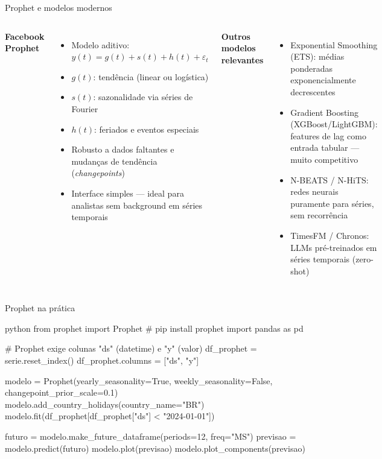 \documentclass[xcolor=dvipsnames,t,aspectratio=169]{beamer}
\newcommand{\highlight}[1]{{\color{nes_dark_orange} #1}}
\begin{document}
\begin{frame}[c]{Prophet e modelos modernos}

\begin{columns}
\textbf{\color{nes_dark_purple}Facebook Prophet}
\begin{itemize}
    \item Modelo aditivo: $y(t) = g(t) + s(t) + h(t) + \varepsilon_t$
    \item $g(t)$: tendência (linear ou logística)
    \item $s(t)$: sazonalidade via séries de Fourier
    \item $h(t)$: feriados e eventos especiais
    \item \highlight{Robusto a dados faltantes} e mudanças de tendência (\emph{changepoints})
    \item Interface simples — ideal para analistas sem background em séries temporais
\end{itemize}

\textbf{\color{nes_dark_purple}Outros modelos relevantes}
\begin{itemize}
    \item \highlight{Exponential Smoothing (ETS)}: médias ponderadas exponencialmente decrescentes
    \item \highlight{Gradient Boosting (XGBoost/LightGBM)}: features de lag como entrada tabular — muito competitivo
    \item \highlight{N-BEATS / N-HiTS}: redes neurais puramente para séries, sem recorrência
    \item \highlight{TimesFM / Chronos}: LLMs pré-treinados em séries temporais (zero-shot)
\end{itemize}
\end{columns}

\end{frame}


\begin{frame}[c, fragile]{Prophet na prática}

\begin{code}{python}
from prophet import Prophet  # pip install prophet
import pandas as pd

# Prophet exige colunas "ds" (datetime) e "y" (valor)
df_prophet = serie.reset_index()
df_prophet.columns = ["ds", "y"]

modelo = Prophet(yearly_seasonality=True,
                 weekly_seasonality=False,
                 changepoint_prior_scale=0.1)
modelo.add_country_holidays(country_name="BR")
modelo.fit(df_prophet[df_prophet["ds"] < "2024-01-01"])

futuro   = modelo.make_future_dataframe(periods=12, freq="MS")
previsao = modelo.predict(futuro)
modelo.plot(previsao)
modelo.plot_components(previsao)
\end{code}

\end{frame}
\end{document}
